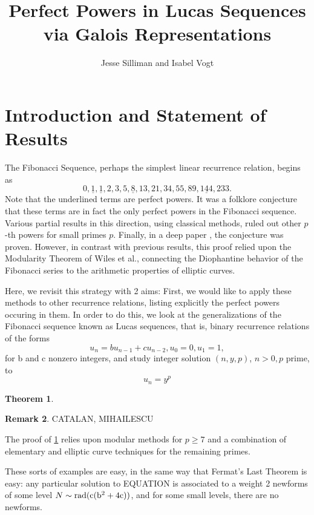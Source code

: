 \documentclass[12pt]{amsart}
\newtheorem{thm}{Theorem}[section]
\theoremstyle{definition}
\newtheorem{rem}[thm]{Remark}
\newcommand{\rad}{\rm rad}
\begin{document}
\title{Perfect Powers in Lucas Sequences via Galois Representations}
\author{Jesse Silliman and Isabel Vogt}

\maketitle


\section{Introduction and Statement of Results}
The Fibonacci Sequence, perhaps the simplest linear recurrence relation, begins as \[0,\underline{1},\underline{1},2,3,5,\underline{8},13,21,34,55,89,\underline{144},233.\] Note that the underlined terms are perfect powers. It was a folklore conjecture that these terms are in fact the only perfect powers in the Fibonacci sequence. Various partial results in this direction, using classical methods, ruled out other $p$-th powers for small primes $p$. Finally, in a deep paper \cite{siksek06}, the conjecture was proven. However, in contrast with previous results, this proof relied upon the Modularity Theorem of Wiles et al., connecting the Diophantine behavior of the Fibonacci series to the arithmetic properties of elliptic curves.

Here, we revisit this strategy with 2 aims: First, we would like to apply these methods to other recurrence relations, listing explicitly the perfect powers occuring in them. In order to do this, we look at the generalizations of the Fibonacci sequence known as Lucas sequences, that is, binary recurrence relations of the forms \[ u_n = b u_{n-1} + c u_{n-2}, u_0 = 0, u_1 = 1, \] for b and c nonzero integers, and study integer solution $(n,y,p)$, $n > 0, p$ prime, to \begin{equation}\label{the_eqn}u_n = y^p\end{equation}

\begin{thm}\label{explicit_eg_thm}
\end{thm}
\begin{rem}
CATALAN, MIHAILESCU
\end{rem}


The proof of \ref{explicit_eg_thm} relies upon modular methods for $p \geq 7$ and a combination of elementary and elliptic curve techniques for the remaining primes. 

These sorts of examples are easy, in the same way that Fermat's Last Theorem is easy: any particular solution to EQUATION is associated to a weight 2 newforms of some level $N \sim \rad(c(b^2+4c))$, and for some small levels, there are no newforms.
\end{document}
